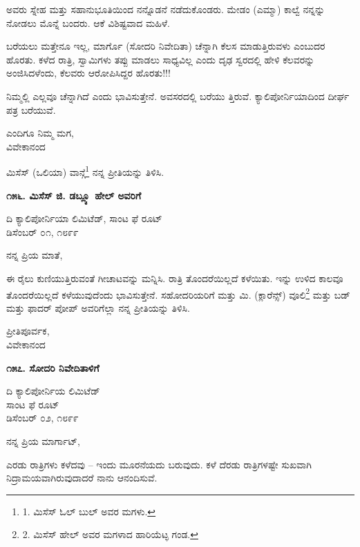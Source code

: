 ಅವರು ಸ್ನೇಹ ಮತ್ತು ಸಹಾನುಭೂತಿಯಿಂದ ನನ್ನೊಡನೆ ನಡೆದುಕೊಂಡರು. ಮೇಡಂ (ಎಮ್ಮಾ) ಕಾಲ್ವೆ ನನ್ನನ್ನು ನೋಡಲು ಮೊನ್ನೆ ಬಂದರು. ಆಕೆ ವಿಶಿಷ್ಟವಾದ ಮಹಿಳೆ.

ಬರೆಯಲು ಮತ್ತೇನೂ ಇಲ್ಲ, ಮಾರ್ಗೊ (ಸೋದರಿ ನಿವೇದಿತಾ) ಚೆನ್ನಾಗಿ ಕೆಲಸ ಮಾಡುತ್ತಿರುವಳು ಎಂಬುದರ ಹೊರತು. ಕಳೆದ ರಾತ್ರಿ, ಸ್ವಾಮಿಗಳು ತಪ್ಪು ಮಾಡಲು ಸಾಧ್ಯವಿಲ್ಲ ಎಂದು ದೃಢ ಸ್ವರದಲ್ಲಿ ಹೇಳಿ ಕೆಲವರನ್ನು ಅಂಜಿಸಿದಳೆಂದು, ಕೆಲವರು ಆರೋಪಿಸಿದ್ದರ ಹೊರತು!!!

ನಿಮ್ಮಲ್ಲಿ ಎಲ್ಲವೂ ಚೆನ್ನಾಗಿದೆ ಎಂದು ಭಾವಿಸುತ್ತೇನೆ. ಅವಸರದಲ್ಲಿ ಬರೆಯು ತ್ತಿರುವೆ. ಕ್ಯಾಲಿಪೋರ್ನಿಯಾದಿಂದ ದೀರ್ಘ ಪತ್ರ ಬರೆಯುವೆ.

\begin{flushright}
ಎಂದಿಗೂ ನಿಮ್ಮ ಮಗ,\\ವಿವೇಕಾನಂದ
\end{flushright}

ಮಿಸೆಸ್ (ಒಲಿಯಾ) ವಾನ್ಗೆ\footnote{1. ಮಿಸೆಸ್ ಓಲ್ ಬುಲ್ ಅವರ ಮಗಳು.} ನನ್ನ ಪ್ರೀತಿಯನ್ನು ತಿಳಿಸಿ.

\begin{center}
\textbf{೧೫೬. ಮಿಸೆಸ್ ಜಿ. ಡಬ್ಲ್ಯೂ ಹೇಲ್ ಅವರಿಗೆ}
\end{center}

\begin{flushright}
ದಿ ಕ್ಯಾಲಿಪೋರ್ನಿಯಾ ಲಿಮಿಟೆಡ್, ಸಾಂಟ ಫೆ ರೂಟ್\\ಡಿಸೆಂಬರ್ ೦೧, ೧೮೯೯
\end{flushright}

ನನ್ನ ಪ್ರಿಯ ಮಾತೆ,

ಈ ರೈಲು ಕುಣಿಯುತ್ತಿರುವಂತೆ ಗೀಚಾಟವನ್ನು ಮನ್ನಿಸಿ. ರಾತ್ರಿ ತೊಂದರೆಯಿಲ್ಲದೆ ಕಳೆಯಿತು. ಇನ್ನು ಉಳಿದ ಕಾಲವೂ ತೊಂದರೆಯಿಲ್ಲದೆ ಕಳೆಯುವುದೆಂದು ಭಾವಿಸುತ್ತೇನೆ. ಸಹೋದರಿಯರಿಗೆ ಮತ್ತು ಮಿ. (ಕ್ಲಾರೆನ್ಸ್) ವೂಲಿ\footnote{2. ಮಿಸೆಸ್ ಹೇಲ್ ಅವರ ಮಗಳಾದ ಹಾರಿಯೆಟ್ಳ ಗಂಡ.} ಮತ್ತು ಬಡ್ ಮತ್ತು ಫಾದರ್ ಪೋಪ್ ಅವರಿಗೆಲ್ಲಾ ನನ್ನ ಪ್ರೀತಿಯನ್ನು ತಿಳಿಸಿ.

\begin{flushright}
ಪ್ರೀತಿಪೂರ್ವಕ,\\ವಿವೇಕಾನಂದ
\end{flushright}

\begin{center}
\textbf{೧೫೭. ಸೋದರಿ ನಿವೇದಿತಾಳಿಗೆ}
\end{center}

\begin{flushright}
ದಿ ಕ್ಯಾಲಿಪೋರ್ನಿಯ ಲಿಮಿಟೆಡ್\\ಸಾಂಟ ಫೆ ರೂಟ್\\ಡಿಸೆಂಬರ್ ೦೨, ೧೮೯೯
\end{flushright}

ನನ್ನ ಪ್ರಿಯ ಮಾರ್ಗಾಟ್,

ಎರಡು ರಾತ್ರಿಗಳು ಕಳೆದವು – ಇಂದು ಮೂರನೆಯದು ಬರುವುದು. ಕಳೆ ದೆರಡು ರಾತ್ರಿಗಳಷ್ಟೇ ಸುಖವಾಗಿ ನಿದ್ರಾಮಯವಾಗಿರುವುದಾದರೆ ನಾನು ಆನಂದಿಸುವೆ.

